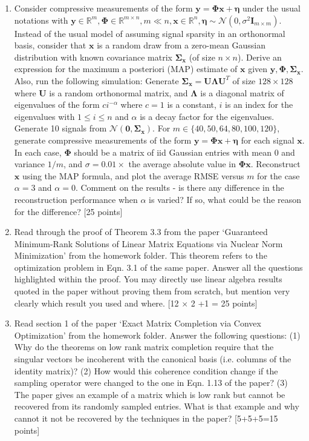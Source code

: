 \documentclass[11pt]{article}
\begin{document}
\begin{enumerate}
\item Consider compressive measurements of the form $\boldsymbol{y} = \boldsymbol{\Phi x} + \boldsymbol{\eta}$ under the usual notations with $\boldsymbol{y} \in \mathbb{R}^m, \boldsymbol{\Phi} \in \mathbb{R}^{m \times n}, m \ll n, \boldsymbol{x} \in \mathbb{R}^n, \boldsymbol{\eta} \sim \mathcal{N}(0,\sigma^2\boldsymbol{I}_{m \times m})$. Instead of the usual model of assuming signal sparsity in an orthonormal basis, consider that $\boldsymbol{x}$ is a random draw from a zero-mean Gaussian distribution with known covariance matrix $\boldsymbol{\Sigma_x}$ (of size $n \times n$). Derive an expression for the maximum a posteriori (MAP) estimate of $\boldsymbol{x}$ given $\boldsymbol{y}, \boldsymbol{\Phi}, \boldsymbol{\Sigma_x}$. Also, run the following simulation:
Generate $\boldsymbol{\Sigma_x} = \boldsymbol{U \Lambda U}^T$ of size $128 \times 128$ where $\boldsymbol{U}$ is a random orthonormal matrix, and $\boldsymbol{\Lambda}$ is a diagonal matrix of eigenvalues of the form $c i^{-\alpha}$ where $c = 1$ is a constant, $i$ is an index for the eigenvalues with $1 \leq i \leq n$ and $\alpha$ is a decay factor for the eigenvalues. Generate 10 signals from $\mathcal{N}(\boldsymbol{0},\boldsymbol{\Sigma_x})$. For $m \in \{40,50,64,80,100,120\}$, generate compressive measurements of the form $\boldsymbol{y} = \boldsymbol{\Phi x} + \boldsymbol{\eta}$ for each signal $\boldsymbol{x}$. In each case, $\boldsymbol{\Phi}$ should be a matrix of iid Gaussian entries with mean 0 and variance $1/m$, and $\sigma = 0.01 \times$ the average absolute value in $\boldsymbol{\Phi x}$. Reconstruct $\boldsymbol{x}$ using the MAP formula, and plot the average RMSE versus $m$ for the case $\alpha = 3$ and $\alpha = 0$. Comment on the results - is there any difference in the reconstruction performance when $\alpha$ is varied? If so, what could be the reason for the difference? \textsf{[25 points]}

\item Read through the proof of Theorem 3.3 from the paper `Guaranteed Minimum-Rank Solutions of Linear Matrix Equations via Nuclear Norm Minimization' from the homework folder. This theorem refers to the optimization problem in Eqn. 3.1 of the same paper. Answer all the questions highlighted within the proof. You may directly use linear algebra results quoted in the paper without proving them from scratch, but mention very clearly which result you used and where. \textsf{[12 $\times$ 2 +1 = 25 points]}

\item Read section 1 of the paper `Exact Matrix Completion via Convex Optimization' from the homework folder. Answer the following questions: (1) Why do the theorems on low rank matrix completion require that the singular vectors be incoherent with the canonical basis (i.e. columns of the identity matrix)? (2) How would this coherence condition change if the sampling operator were changed to the one in Eqn. 1.13 of the paper? (3) The paper gives an example of a matrix which is low rank but cannot be recovered from its randomly sampled entries. What is that example and why cannot it not be recovered by the techniques in the paper? \textsf{[5+5+5=15 points]}


\end{enumerate}
\end{document}
